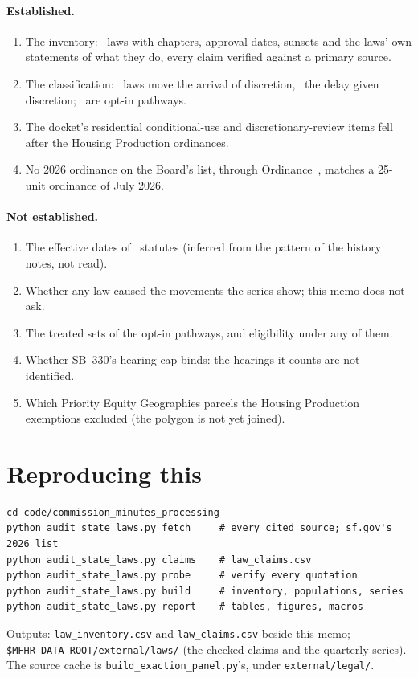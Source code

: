 \documentclass[11pt]{article}
\begin{document}
\paragraph{Established.}
\begin{enumerate}
\item The inventory: \rtLaws\ laws with chapters, approval dates, sunsets and the laws' own
statements of what they do, every claim verified against a primary source.
\item The classification: \rtCatOne\ laws move the arrival of discretion, \rtCatTwo\ the delay
given discretion; \rtOptIn\ are opt-in pathways.
\item The docket's residential conditional-use and discretionary-review items fell after the
Housing Production ordinances.
\item No 2026 ordinance on the Board's list, through Ordinance~\rtSfLastOrd, matches a 25-unit
ordinance of July 2026.
\end{enumerate}

\paragraph{Not established.}
\begin{enumerate}
\item The effective dates of \rtEffInferred\ statutes (inferred from the pattern of the history
notes, not read).
\item Whether any law caused the movements the series show; this memo does not ask.
\item The treated sets of the opt-in pathways, and eligibility under any of them.
\item Whether SB~330's hearing cap binds: the hearings it counts are not identified.
\item Which Priority Equity Geographies parcels the Housing Production exemptions excluded (the polygon is
not yet joined).
\end{enumerate}

\section{Reproducing this}\label{sec:rtrepro}

\begin{verbatim}
cd code/commission_minutes_processing
python audit_state_laws.py fetch     # every cited source; sf.gov's 2026 list
python audit_state_laws.py claims    # law_claims.csv
python audit_state_laws.py probe     # verify every quotation
python audit_state_laws.py build     # inventory, populations, series
python audit_state_laws.py report    # tables, figures, macros
\end{verbatim}
Outputs: \texttt{law\_inventory.csv} and \texttt{law\_claims.csv} beside this memo;
\texttt{\$MFHR\_DATA\_ROOT/external/laws/} (the checked claims and the quarterly series). The
source cache is \texttt{build\_exaction\_panel.py}'s, under \texttt{external/legal/}.
\end{document}
